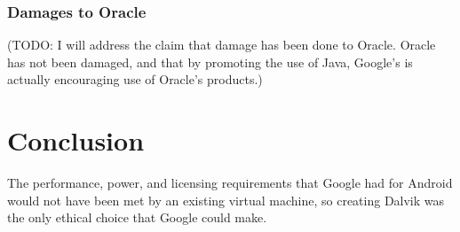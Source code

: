 \documentclass[11pt]{article}
\begin{document}
\begin{multicols}{2}
\subsubsection{Damages to Oracle} %
\label{ssub:oracle-damage}

(TODO: I will address the claim that damage has been done to Oracle.  Oracle has
not been damaged, and that by promoting the use of Java, Google's is actually
encouraging use of Oracle's products.)




\section{Conclusion} %
\label{sec:conclusion}

The performance, power, and licensing requirements that Google had for Android
would not have been met by an existing virtual machine, so creating Dalvik was
the only ethical choice that Google could make.


\end{multicols}
\newpage

\nocite{*}


\end{document}
